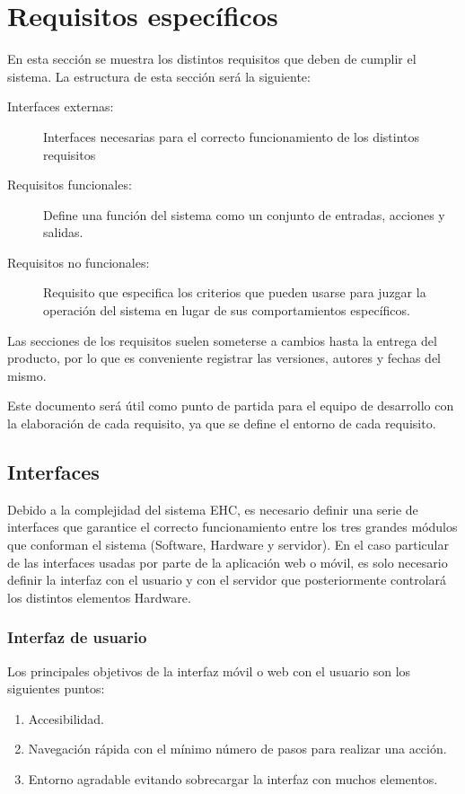 \chapter{Requisitos espec\'ificos}
En esta secci\'on se muestra los distintos requisitos que deben de cumplir el sistema. La estructura de esta secci\'on ser\'a la siguiente:
\begin{description}
\item[Interfaces externas:]{Interfaces necesarias para el correcto funcionamiento de los distintos requisitos}
\item[Requisitos funcionales:]{Define una funci\'on del sistema como un conjunto de entradas, acciones y salidas.}
\item[Requisitos no funcionales:]{Requisito que especifica los criterios que pueden usarse para juzgar la operaci\'on del sistema en lugar de sus comportamientos espec\'ificos.}
\end{description}

Las secciones de los requisitos suelen someterse a cambios hasta la entrega del producto, por lo que es conveniente registrar las versiones, autores y fechas del mismo. 

Este documento ser\'a \'util como punto de partida para el equipo de desarrollo con la elaboraci\'on de cada requisito, ya que se define el entorno de cada requisito. 

\section{Interfaces}
Debido a la complejidad del sistema EHC, es necesario definir una serie de interfaces que garantice el correcto funcionamiento entre los tres grandes m\'odulos que conforman el sistema (Software, Hardware y servidor). En el caso particular de las interfaces usadas por parte de la aplicaci\'on web o m\'ovil, es solo necesario definir la interfaz con el usuario y con el servidor que posteriormente controlar\'a los distintos elementos Hardware.

\subsection{Interfaz de usuario}
Los principales objetivos de la interfaz m\'ovil o web con el usuario son los siguientes puntos:
\begin{enumerate}
\item Accesibilidad.
\item Navegaci\'on r\'apida con el m\'inimo n\'umero de pasos para realizar una acci\'on.
\item Entorno agradable evitando sobrecargar la interfaz con muchos elementos.
\end{enumerate}

